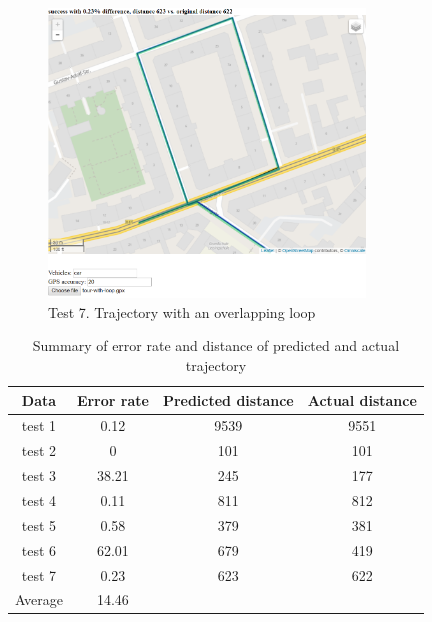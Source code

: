 \documentclass[a4paper]{article}
\begin{document}
\begin{figure}
\centering
\includegraphics[width=0.75\textwidth]{fig11.png}
\caption{\label{fig:data} Test 7. Trajectory with an overlapping loop }
\end{figure}

\begin{table}[]
\centering
\begin{tabular}{|c|c|c|c|}
\hline
Data    & Error rate & Predicted distance & Actual distance \\ \hline
test 1  & 0.12       & 9539               & 9551            \\ \hline
test 2  & 0          & 101                & 101             \\ \hline
test 3  & 38.21      & 245                & 177             \\ \hline
test 4  & 0.11       & 811                & 812             \\ \hline
test 5  & 0.58       & 379                & 381             \\ \hline
test 6  & 62.01      & 679                & 419             \\ \hline
test 7  & 0.23       & 623                & 622             \\ \hline
Average & 14.46      &                    &                 \\ \hline
\end{tabular}
\caption{\label{fig:data} Summary of error rate and distance of predicted and actual trajectory }
\end{table}
\end{document}
